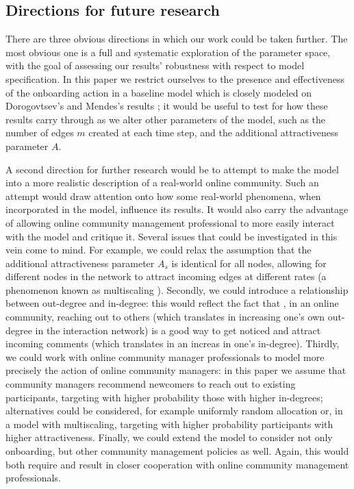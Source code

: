 \documentclass{nws}
\begin{document}
\subsection{Directions for future research}

There are three obvious directions in which our work could be taken further. The most obvious one is a full and systematic exploration of the parameter space, with the goal of assessing our results' robustness with respect to model specification. In this paper we restrict ourselves to the presence and effectiveness of the onboarding action in a baseline model which is closely modeled on Dorogovtsev's and Mendes's results \cite{dorogovtsev2002evolution}; it would be useful to test for how these results carry through as we alter other parameters of the model, such as the number of edges $m$ created at each time step, and the additional attractiveness parameter $A$. 

A second direction for further research would be to attempt to make the model into a more realistic description of a real-world online community. Such an attempt would draw attention onto how some real-world phenomena, when incorporated in the model, influence its results. It would also carry the advantage of allowing online community management professional to more easily interact with the model and critique it. Several issues that could be investigated in this vein come to mind. For example, we could relax the assumption that the additional attractiveness parameter $A_s$ is identical for all nodes, allowing for different nodes in the network to attract incoming edges at different rates (a phenomenon known as multiscaling \cite{bianconi2001competition}). Secondly, we could introduce a relationship between out-degree and in-degree: this would reflect the fact that , in an online community, reaching out to others (which translates in increasing one's own out-degree in the interaction network) is a good way to get noticed and attract incoming comments (which translates in an increas in one's in-degree). Thirdly, we could work with online community manager professionals to model more precisely the action of online community managers: in this paper we assume that community managers recommend newcomers to reach out to existing participants, targeting with higher probability those with higher in-degrees; alternatives could be considered, for example uniformly random allocation or, in a model with multiscaling, targeting with higher probability participants with higher attractiveness. Finally, we could extend the model to consider not only onboarding, but other community management policies as well. Again, this would both require and result in closer cooperation with online community management professionals.
\end{document}
